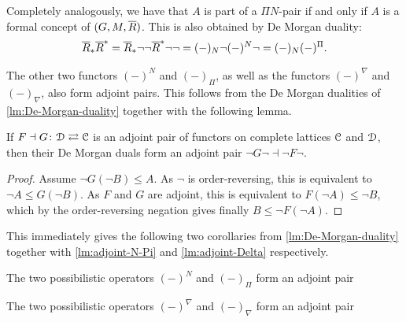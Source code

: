 \begin{remark}
    Completely analogously, we have that $A$ is part of a $\Pi N$-pair if and only if $A$ is a formal concept of $(G,M,\overline{R})$. This is also obtained by De Morgan duality: 
    \[\overline{R}_* \overline{R}^*= \overline{R}_*\neg\neg \overline{R}^* \neg\neg= (-)_N \neg (-)^N\neg = (-)_N (-)^\Pi.\]
\end{remark}

The other two functors $(-)^N$ and $(-)_\Pi$, as well as the functors $(-)^\nabla$ and $(-)_\nabla$, also form adjoint pairs. This follows from the De Morgan dualities of \cref{lm:De-Morgan-duality} together with the following lemma. 

\begin{lemma}
    If $F\dashv G\colon \EuScript{D} \rightleftarrows \EuScript{C}$ is an adjoint pair of functors on complete lattices $\EuScript{C}$ and $\EuScript{D}$, then their De Morgan duals form an adjoint pair $\neg G\neg \dashv \neg F\neg$. 
\end{lemma}
\begin{proof}
    Assume $\neg G(\neg B)\leq A$. As $\neg$ is order-reversing, this is equivalent to $\neg A \leq  G(\neg B)$. As $F$ and $G$ are adjoint, this is equivalent to $F(\neg A) \leq \neg B$, which by the order-reversing negation gives finally $B \leq \neg F(\neg A)$.
\end{proof}

This immediately gives the following two corollaries from \cref{lm:De-Morgan-duality} together with \cref{lm:adjoint-N-Pi} and \cref{lm:adjoint-Delta} respectively. 

\begin{corollary}
    \label{lm:adjoint-N-Pi}
    The two possibilistic operators $(-)^N$ and $(-)_\Pi$ form an adjoint pair
    \begin{center}
    \end{center}
\end{corollary} 

\begin{corollary}
    \label{lm:adjoint-nabla}
    The two possibilistic operators $(-)^\nabla$ and $(-)_\nabla$ form an adjoint pair
    \begin{center}
    \end{center}
\end{corollary}

